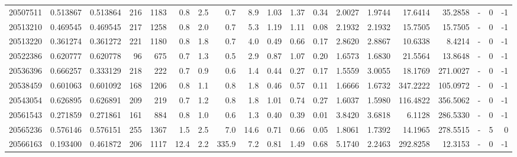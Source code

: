 \begin{tabular}{rrrrrrrrrrrrrrrrlrr}
  20507511 & 0.513867 &   0.513864 &  216 & 1183 &      0.8 &      2.5 &     0.7 &      8.9 &       1.03 &        1.37 &        0.34 &  2.0027 &  1.9744 &   17.6414 &   35.2858 &             - &        0 &         -1 \\
  20513210 & 0.469545 &   0.469545 &  217 & 1258 &      0.8 &      2.0 &     0.7 &      5.3 &       1.19 &        1.11 &        0.08 &  2.1932 &  2.1932 &   15.7505 &   15.7505 &             - &        0 &         -1 \\
  20513220 & 0.361274 &   0.361272 &  221 & 1180 &      0.8 &      1.8 &     0.7 &      4.0 &       0.49 &        0.66 &        0.17 &  2.8620 &  2.8867 &   10.6338 &    8.4214 &             - &        0 &         -1 \\
  20522386 & 0.620777 &   0.620778 &   96 &  675 &      0.7 &      1.3 &     0.5 &      2.9 &       0.87 &        1.07 &        0.20 &  1.6573 &  1.6830 &   21.5564 &   13.8648 &             - &        0 &         -1 \\
  20536396 & 0.666257 &   0.333129 &  218 &  222 &      0.7 &      0.9 &     0.6 &      1.4 &       0.44 &        0.27 &        0.17 &  1.5559 &  3.0055 &   18.1769 &  271.0027 &             - &        0 &         -1 \\
  20538459 & 0.601063 &   0.601092 &  168 & 1206 &      0.8 &      1.1 &     0.8 &      1.8 &       0.46 &        0.57 &        0.11 &  1.6666 &  1.6732 &  347.2222 &  105.0972 &             - &        0 &         -1 \\
  20543054 & 0.626895 &   0.626891 &  209 &  219 &      0.7 &      1.2 &     0.8 &      1.8 &       1.01 &        0.74 &        0.27 &  1.6037 &  1.5980 &  116.4822 &  356.5062 &             - &        0 &         -1 \\
  20561543 & 0.271859 &   0.271861 &  161 &  884 &      0.8 &      1.0 &     0.6 &      1.3 &       0.40 &        0.39 &        0.01 &  3.8420 &  3.6818 &    6.1128 &  286.5330 &             - &        0 &         -1 \\
  20565236 & 0.576146 &   0.576151 &  255 & 1367 &      1.5 &      2.5 &     7.0 &     14.6 &       0.71 &        0.66 &        0.05 &  1.8061 &  1.7392 &   14.1965 &  278.5515 &             - &        5 &          0 \\
  20566163 & 0.193400 &   0.461872 &  206 & 1117 &     12.4 &      2.2 &   335.9 &      7.2 &       0.81 &        1.49 &        0.68 &  5.1740 &  2.2463 &  292.8258 &   12.3153 &             - &        0 &         -1 \\

\end{tabular}
